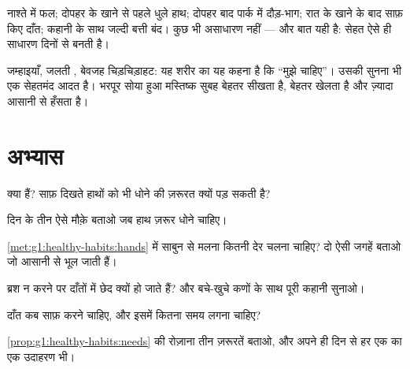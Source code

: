\begin{example}[शरीर के लिए एक अच्छा दिन]\label{ex:g1:healthy-habits:day}
नाश्ते में फल; दोपहर के खाने से पहले धुले हाथ; दोपहर बाद पार्क में
दौड़-भाग; रात के खाने के बाद साफ़ किए दाँत; कहानी के साथ जल्दी बत्ती
बंद। कुछ भी असाधारण नहीं --- और बात यही है: सेहत ऐसे ही साधारण दिनों
से बनती है।
\end{example}

\begin{remark}[थकान एक संदेश है]\label{rem:g1:healthy-habits:tired}
जम्हाइयाँ, जलती , बेवजह चिड़चिड़ाहट: यह शरीर का यह कहना है कि
``मुझे  चाहिए''। उसकी सुनना भी एक सेहतमंद आदत है। भरपूर सोया हुआ
मस्तिष्क सुबह बेहतर सीखता है, बेहतर खेलता है और ज़्यादा आसानी से हँसता
है।
\end{remark}

\section{अभ्यास}

\begin{exercise}[$\star$]\label{exo:g1:healthy-habits:1}
 क्या हैं? साफ़ दिखते हाथों को भी धोने की ज़रूरत क्यों पड़ सकती है?
\end{exercise}

\begin{exercise}[$\star$]\label{exo:g1:healthy-habits:2}
दिन के तीन ऐसे मौक़े बताओ जब हाथ ज़रूर धोने चाहिए।
\end{exercise}

\begin{exercise}[$\star$]\label{exo:g1:healthy-habits:3}
\cref{met:g1:healthy-habits:hands} में साबुन से मलना कितनी देर चलना
चाहिए? दो ऐसी जगहें बताओ जो आसानी से भूल जाती हैं।
\end{exercise}

\begin{exercise}[$\star$]\label{exo:g1:healthy-habits:4}
ब्रश न करने पर दाँतों में छेद क्यों हो जाते हैं?  और बचे-खुचे
कणों के साथ पूरी कहानी सुनाओ।
\end{exercise}

\begin{exercise}[$\star$]\label{exo:g1:healthy-habits:5}
दाँत कब साफ़ करने चाहिए, और इसमें कितना समय लगना चाहिए?
\end{exercise}

\begin{exercise}[$\star$]\label{exo:g1:healthy-habits:6}
\cref{prop:g1:healthy-habits:needs} की रोज़ाना तीन ज़रूरतें बताओ, और
अपने ही दिन से हर एक का एक उदाहरण भी।
\end{exercise}

